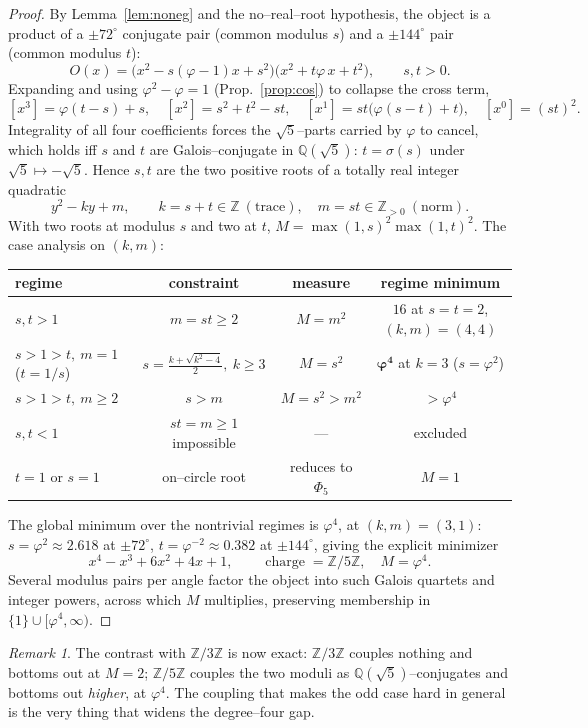 \documentclass[11pt]{article}
\newcommand{\Z}{\mathbb{Z}}
\newcommand{\Q}{\mathbb{Q}}
\newcommand{\Mah}{M}
\newcommand{\Zfive}{\Z/5\Z}
\DeclareMathOperator{\charge}{charge}
\theoremstyle{plain}
\theoremstyle{definition}
\theoremstyle{remark}
\newtheorem{remark}[theorem]{Remark}
\begin{document}
\begin{proof}
By Lemma~\ref{lem:noneg} and the no--real--root hypothesis, the object is a product of a $\pm72^\circ$
conjugate pair (common modulus $s$) and a $\pm144^\circ$ pair (common modulus $t$):
\[
O(x)=\bigl(x^2-s(\varphi-1)x+s^2\bigr)\bigl(x^2+t\varphi\, x+t^2\bigr),\qquad s,t>0.
\]
Expanding and using $\varphi^2-\varphi=1$ (Prop.~\ref{prop:cos}) to collapse the cross term,
\[
[x^3]=\varphi(t-s)+s,\quad [x^2]=s^2+t^2-st,\quad [x^1]=st\bigl(\varphi(s-t)+t\bigr),\quad [x^0]=(st)^2.
\]
Integrality of all four coefficients forces the $\sqrt5$--parts carried by $\varphi$ to cancel, which
holds iff $s$ and $t$ are Galois--conjugate in $\Q(\sqrt5)$: $t=\sigma(s)$ under $\sqrt5\mapsto-\sqrt5$.
Hence $s,t$ are the two positive roots of a totally real integer quadratic
\[
y^2-ky+m,\qquad k=s+t\in\Z\ (\text{trace}),\quad m=st\in\Z_{>0}\ (\text{norm}).
\]
With two roots at modulus $s$ and two at $t$, $\Mah=\max(1,s)^2\max(1,t)^2$. The case analysis on
$(k,m)$:
\begin{center}\small
\begin{tabular}{lccc}
\toprule
regime & constraint & measure & regime minimum\\
\midrule
$s,t>1$ & $m=st\ge2$ & $\Mah=m^2$ & $16$ at $s{=}t{=}2$, $(k,m){=}(4,4)$\\
$s>1>t,\ m=1$ ($t=1/s$) & $s=\tfrac{k+\sqrt{k^2-4}}2,\ k\ge3$ & $\Mah=s^2$ & $\boldsymbol{\varphi^4}$ at $k{=}3$ ($s{=}\varphi^2$)\\
$s>1>t,\ m\ge2$ & $s>m$ & $\Mah=s^2>m^2$ & $>\varphi^4$\\
$s,t<1$ & $st=m\ge1$ impossible & --- & excluded\\
$t=1$ or $s=1$ & on--circle root & reduces to $\Phi_5$ & $\Mah=1$\\
\bottomrule
\end{tabular}
\end{center}
The global minimum over the nontrivial regimes is $\varphi^4$, at $(k,m)=(3,1)$: $s=\varphi^2\approx
2.618$ at $\pm72^\circ$, $t=\varphi^{-2}\approx0.382$ at $\pm144^\circ$, giving the explicit minimizer
\[
x^4-x^3+6x^2+4x+1,\qquad \charge=\Zfive,\quad \Mah=\varphi^4.
\]
Several modulus pairs per angle factor the object into such Galois quartets and integer powers, across
which $\Mah$ multiplies, preserving membership in $\{1\}\cup[\varphi^4,\infty)$.
\end{proof}

\begin{remark}
The contrast with $\Z/3\Z$ is now exact: $\Z/3\Z$ couples nothing and bottoms out at $\Mah=2$;
$\Zfive$ couples the two moduli as $\Q(\sqrt5)$--conjugates and bottoms out \emph{higher}, at
$\varphi^4$. The coupling that makes the odd case hard in general is the very thing that widens the
degree--four gap.
\end{remark}
\end{document}
